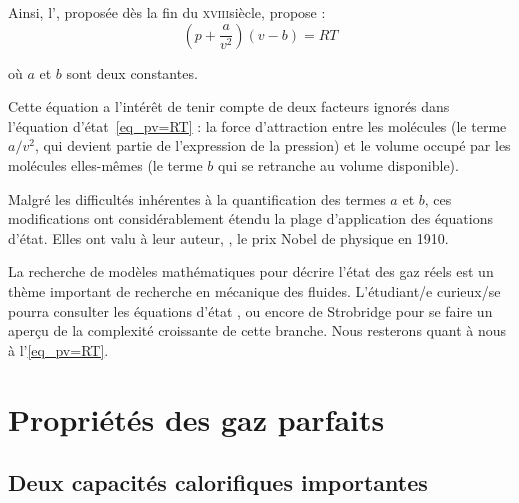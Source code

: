 		Ainsi, l’, proposée dès la fin du \textsc{xviii}\ieme siècle, propose :
		\begin{equation}
			\left(p + \frac{a}{v ^2}\right) (v - b) = R T
		\end{equation}
		\begin{equationterms}
			\item où $a$ et $b$ sont deux constantes.
		\end{equationterms}

		Cette équation a l’intérêt de tenir compte de deux facteurs ignorés dans l’équation d’état~\ref{eq_pv=RT} : la force d’attraction entre les molécules (le terme $a/v^2$, qui devient partie de l’expression de la pression) et le volume occupé par les molécules elles-mêmes (le terme $b$ qui se retranche au volume disponible).

		Malgré les difficultés inhérentes à la quantification des termes $a$ et $b$, ces modifications ont considérablement étendu la plage d’application des équations d’état. Elles ont valu à leur auteur, , le prix Nobel de physique en 1910.

		La recherche de modèles mathématiques pour décrire l’état des gaz réels est un thème important de recherche en mécanique des fluides. L’étudiant/e curieux/se pourra consulter les équations d’état ,  ou encore de Strobridge pour se faire un aperçu de la complexité croissante de cette branche. Nous resterons quant à nous à l’\cref{eq_pv=RT}.



\section{Propriétés des gaz parfaits}

	\subsection{Deux capacités calorifiques importantes}

